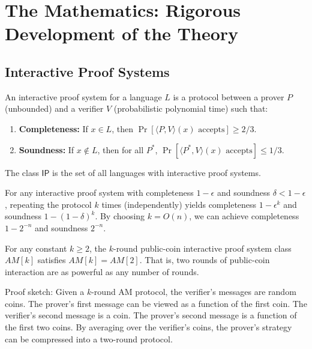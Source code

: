 \section{The Mathematics: Rigorous Development of the Theory}
\label{sec:ip:math}

\subsection{Interactive Proof Systems}

\begin{definition}
An interactive proof system for a language $L$ is a protocol between a prover $P$ (unbounded) and a verifier $V$ (probabilistic polynomial time) such that:
\begin{enumerate}
\item \textbf{Completeness:} If $x \in L$, then $\Pr[\langle P, V \rangle(x) \text{ accepts}] \ge 2/3$.
\item \textbf{Soundness:} If $x \notin L$, then for all $P^*$, $\Pr[\langle P^*, V \rangle(x) \text{ accepts}] \le 1/3$.
\end{enumerate}
The class $\mathsf{IP}$ is the set of all languages with interactive proof systems.
\end{definition}

\begin{theorem}
For any interactive proof system with completeness $1-\epsilon$ and soundness $\delta < 1-\epsilon$, repeating the protocol $k$ times (independently) yields completeness $1-\epsilon^k$ and soundness $1-(1-\delta)^k$. By choosing $k = O(n)$, we can achieve completeness $1 - 2^{-n}$ and soundness $2^{-n}$.
\end{theorem}

\begin{theorem}
For any constant $k \ge 2$, the $k$-round public-coin interactive proof system class $AM[k]$ satisfies $AM[k] = AM[2]$. That is, two rounds of public-coin interaction are as powerful as any number of rounds.

Proof sketch: Given a $k$-round AM protocol, the verifier's messages are random coins. The prover's first message can be viewed as a function of the first coin. The verifier's second message is a coin. The prover's second message is a function of the first two coins. By averaging over the verifier's coins, the prover's strategy can be compressed into a two-round protocol.
\end{theorem}


